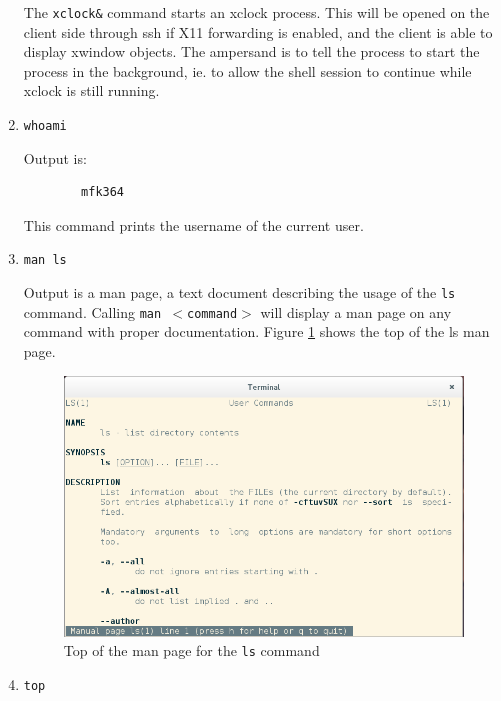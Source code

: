 \documentclass[a4paper,12pt]{UoBnote}
\begin{document}
\begin{enumerate}[label=\alph*)]
		The \texttt{xclock\&} command starts an xclock process. This will be opened on the client side through ssh if X11 forwarding is enabled, and the client is able to display xwindow objects. The ampersand is to tell the process to start the process in the background, ie. to allow the shell session to continue while xclock is still running.
	\item \texttt{whoami}

		Output is:
		\begin{verbatim}
		mfk364
		\end{verbatim}

		This command prints the username of the current user.

	\item \texttt{man ls}

		Output is a man page, a text document describing the usage of the \texttt{ls} command. Calling \texttt{man $<$command$>$} will display a man page on any command with proper documentation. Figure \ref{fig:manpage} shows the top of the ls man page.
		\begin{figure}
			\centering
			\includegraphics[scale=0.5]{manls}
			\caption{Top of the man page for the \texttt{ls} command}
			\label{fig:manpage}
		\end{figure}

	\item \texttt{top}


\end{enumerate}
\end{document}
